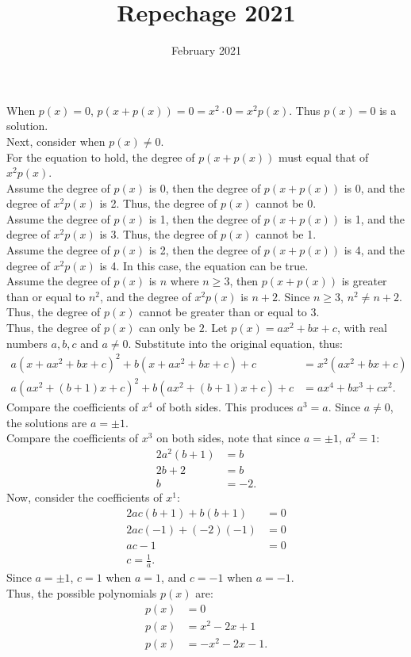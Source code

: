 \documentclass{article}
\title{Repechage 2021}
\date{February 2021}
\begin{document}
When $p(x) = 0$, $p(x+p(x)) = 0 = x^2\cdot 0 = x^2p(x)$. Thus $p(x) = 0$ is a solution. \\

Next, consider when $p(x)\neq 0.$ \\
For the equation to hold, the degree of $p(x + p(x))$ must equal that of $x^2p(x)$. \\
Assume the degree of $p(x)$ is 0, then the degree of $p(x + p(x))$ is 0, and the degree of $x^2p(x)$ is 2. Thus, the degree of $p(x)$ cannot be 0. \\
Assume the degree of $p(x)$ is 1, then the degree of $p(x + p(x))$ is 1, and the degree of $x^2p(x)$ is 3. Thus, the degree of $p(x)$ cannot be 1. \\
Assume the degree of $p(x)$ is 2, then the degree of $p(x + p(x))$ is 4, and the degree of $x^2p(x)$ is 4. In this case, the equation can be true. \\
Assume the degree of $p(x)$ is $n$ where $n\ge3$, then $p(x + p(x))$ is greater than or equal to $n^2$, and the degree of $x^2p(x)$ is $n + 2$. Since $n\ge3$, $n^2\neq n + 2. $ Thus, the degree of $p(x)$ cannot be greater than or equal to $3$. \\

Thus, the degree of $p(x)$ can only be $2$. Let $p(x) = ax^2 + bx + c$, with real numbers $a,b,c$ and $a\neq 0$. Substitute into the original equation, thus:
\begin{align*}
    a(x + ax^2 + bx + c)^2 + b(x + ax^2 + bx + c) + c &= x^2(ax^2 + bx + c) \\
    a(ax^2 + (b+1)x + c)^2 + b(ax^2 + (b+1)x + c) + c &= ax^4 + bx^3 + cx^2.
\end{align*}
Compare the coefficients of $x^4$ of both sides. This produces $a^3 = a$. Since $a\neq 0$, the solutions are $a=\pm 1$. \\
Compare the coefficients of $x^3$ on both sides, note that since $a=\pm 1$, $a^2=1$:
\begin{align*}
    2a^2(b+1) &= b \\
    2b + 2 &= b \\
    b &= -2.
\end{align*}
Now, consider the coefficients of $x^1$:
\begin{align*}
    2ac(b+1) + b(b+1) &= 0 \\
    2ac(-1) + (-2)(-1) &= 0 \\
    ac-1 &= 0 \\
    c = \frac{1}{a}.
\end{align*}
Since $a=\pm 1$, $c=1$ when $a=1$, and $c=-1$ when $a=-1$. \\

Thus, the possible polynomials $p(x)$ are:
\begin{align*}
    p(x) &= 0 \\
    p(x) &= x^2 - 2x + 1 \\
    p(x) &= -x^2 -2x - 1.
\end{align*}
\end{document}
